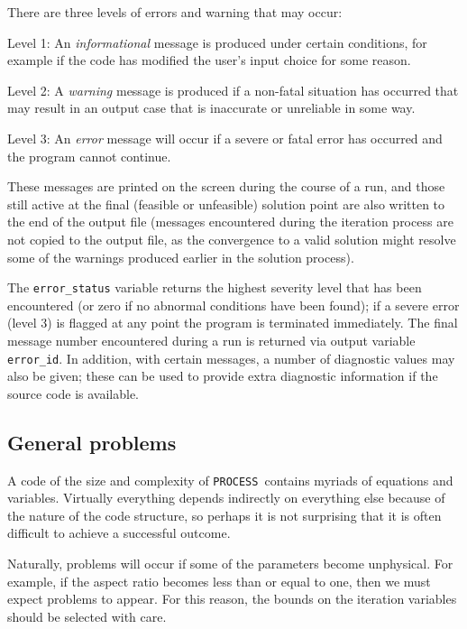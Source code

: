 \documentclass[11pt,a4paper]{report}
\newcommand{\process}{\mbox{\texttt{PROCESS}}}
\begin{document}
There are three levels of errors and warning that may occur:
\begin{description}

\item{Level 1:} An \textit{informational}\/ message is produced under certain
  conditions, for example if the code has modified the user's input choice for
  some reason.

\item{Level 2:} A \textit{warning}\/ message is produced if a non-fatal situation has
  occurred that may result in an output case that is inaccurate or
  unreliable in some way.

\item{Level 3:} An \textit{error}\/ message will occur if a severe or fatal
  error has occurred and the program cannot continue.

\end{description}

These messages are printed on the screen during the course of a run, and those
still active at the final (feasible or unfeasible) solution point are also
written to the end of the output file (messages encountered during the
iteration process are not copied to the output file, as the convergence to a
valid solution might resolve some of the warnings produced earlier in the
solution process).

The \texttt{error\_status} variable returns the highest severity level that
has been encountered (or zero if no abnormal conditions have been found); if a
severe error (level 3) is flagged at any point the program is terminated
immediately. The final message number encountered during a run is returned via
output variable \texttt{error\_id}. In addition, with certain messages, a
number of diagnostic values may also be given; these can be used to provide
extra diagnostic information if the source code is available.

\subsection{General problems}

A code of the size and complexity of \process\ contains myriads of equations
and variables. Virtually everything depends indirectly on everything else
because of the nature of the code structure, so perhaps it is not surprising
that it is often difficult to achieve a successful outcome.

Naturally, problems will occur if some of the parameters become unphysical.
For example, if the aspect ratio becomes less than or equal to one, then we
must expect problems to appear. For this reason, the bounds on the
iteration variables should be selected with care.
\end{document}

